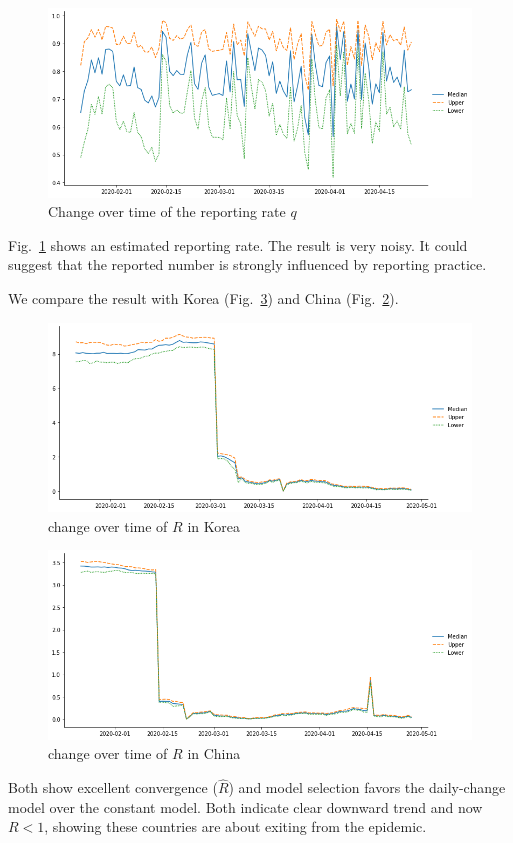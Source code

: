 \documentclass{amsart}
\begin{document}
\begin{figure}[h]
 \centering
 \includegraphics[width=\linewidth]{fig/q-Japan.png}
 \caption{Change over time of the reporting rate $q$}
 \label{fig:q}
\end{figure}

Fig.~\ref{fig:q} shows an estimated reporting rate.
The result is very noisy.
It could suggest that the reported number is strongly influenced by reporting practice.

We compare the result with Korea (Fig.~\ref{fig:R-China}) and China (Fig.~\ref{fig:R-Korea}).
\begin{figure}[h]
    \centering
    \includegraphics[width=\linewidth]{fig/R-Korea.png}
    \caption{ change over time of $R$ in Korea}
    \label{fig:R-Korea}
\end{figure}
\begin{figure}[h]
    \centering
    \includegraphics[width=\linewidth]{fig/R-China.png}
    \caption{ change over time of $R$ in China}
    \label{fig:R-China}
\end{figure}
Both show excellent convergence ($\hat{R}$) and model selection favors the daily-change model over the constant model.
Both indicate clear downward trend and now $R < 1$, showing these countries are about exiting from the epidemic.
\end{document}
